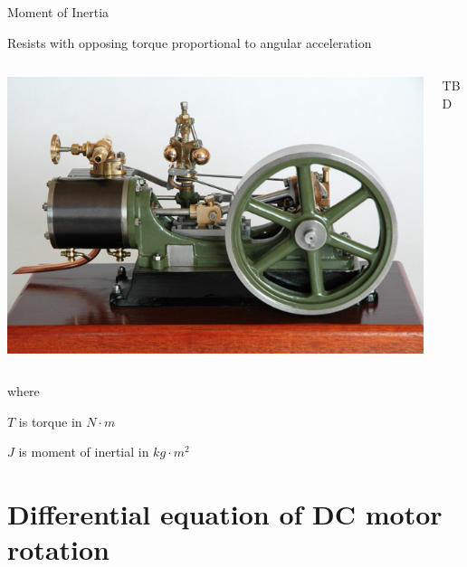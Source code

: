 \documentclass[compress]{beamer}
\begin{document}
\begin{frame}{Moment of Inertia}

Resists with opposing torque proportional to angular acceleration

    \begin{columns}
        \begin{column}{0.5\linewidth}
            \begin{center}
                \includegraphics[height=0.3\paperheight]{image62}
            \end{center}
        \end{column}
        \begin{column}{0.5\linewidth}
            TBD
        \end{column}
    \end{columns}
where

$T$ is torque in $N\cdot m$

$J$ is moment of inertial in $kg \cdot m^2$

\end{frame}

\section{Differential equation of DC motor rotation}
\end{document}
